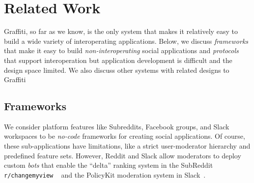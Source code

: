 \section{Related Work}
\label{related-work}

Graffiti, so far as we know, is the only system that makes it
relatively easy to build a wide variety of interoperating applications.
Below, we discuss \emph{frameworks} that make it easy to build
\emph{non-interoperating} social applications
and \emph{protocols} that support interoperation but
application development is difficult and the design space limited.
We also discuss other systems with related designs to Graffiti


\subsection{Frameworks}

We consider platform features like Subreddits, Facebook groups, and
Slack workspaces to be \emph{no-code} frameworks for creating social
applications.
Of course, these sub-applications have limitations,
like a strict user-moderator hierarchy
and predefined feature sets.
However, Reddit and Slack allow moderators to deploy
custom \emph{bots} that enable the
``delta'' ranking system in the SubReddit \texttt{r/changemyview}
~\cite{changemyview}
and the PolicyKit moderation system in Slack~\cite{policykit}.

